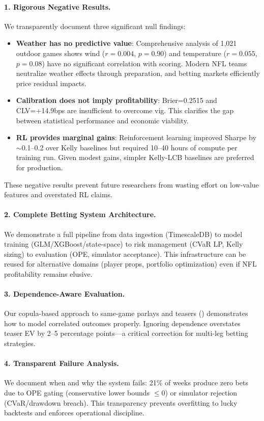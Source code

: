 \paragraph{1. Rigorous Negative Results.}
We transparently document three significant null findings:
\begin{itemize}
  \item \textbf{Weather has no predictive value}: Comprehensive analysis of 1,021 outdoor games shows wind ($r=0.004$, $p=0.90$) and temperature ($r=0.055$, $p=0.08$) have no significant correlation with scoring. Modern NFL teams neutralize weather effects through preparation, and betting markets efficiently price residual impacts.
  \item \textbf{Calibration does not imply profitability}: Brier=0.2515 and CLV=+14.9bps are insufficient to overcome vig. This clarifies the gap between statistical performance and economic viability.
  \item \textbf{RL provides marginal gains}: Reinforcement learning improved Sharpe by $\sim$0.1--0.2 over Kelly baselines but required 10--40 hours of compute per training run. Given modest gains, simpler Kelly-LCB baselines are preferred for production.
\end{itemize}

These negative results prevent future researchers from wasting effort on low-value features and overstated RL claims.

\paragraph{2. Complete Betting System Architecture.}
We demonstrate a full pipeline from data ingestion (TimescaleDB) to model training (GLM/XGBoost/state-space) to risk management (CVaR LP, Kelly sizing) to evaluation (OPE, simulator acceptance). This infrastructure can be reused for alternative domains (player props, portfolio optimization) even if NFL profitability remains elusive.

\paragraph{3. Dependence-Aware Evaluation.}
Our copula-based approach to same-game parlays and teasers () demonstrates how to model correlated outcomes properly. Ignoring dependence overstates teaser EV by 2--5 percentage points—a critical correction for multi-leg betting strategies.

\paragraph{4. Transparent Failure Analysis.}
We document when and why the system fails: 21\% of weeks produce zero bets due to OPE gating (conservative lower bounds $\le 0$) or simulator rejection (CVaR/drawdown breach). This transparency prevents overfitting to lucky backtests and enforces operational discipline.

